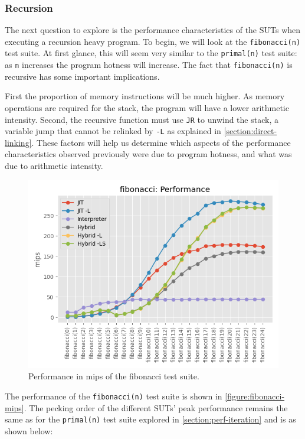 \subsubsection{Recursion}
\label{section:perf-recursion}

The next question to explore is the performance characteristics of the SUTs when executing a recursion heavy program. To begin, we will look at the \texttt{fibonacci(n)} test suite. At first glance, this will seem very similar to the \texttt{primal(n)} test suite: as \texttt{n} increases the program hotness will increase. The fact that \texttt{fibonacci(n)} is recursive has some important implications.

First the proportion of memory instructions will be much higher. As memory operations are required for the stack, the program will have a lower arithmetic intensity. Second, the recursive function must use \texttt{JR} to unwind the stack, a variable jump that cannot be relinked by \texttt{-L} as explained in \autoref{section:direct-linking}. These factors will help us determine which aspects of the performance characteristics observed previously were due to program hotness, and what was due to arithmetic intensity.

\begin{figure}[H]
    \centering
    \includegraphics[scale=0.75]{output/graphs/tests/all/fibonacci/mips.png}
    \caption{Performance in mips of the fibonacci test suite.}
    \label{figure:fibonacci-mips}
\end{figure}

The performance of the \texttt{fibonacci(n)} test suite is shown in \autoref{figure:fibonacci-mips}. The pecking order of the different SUTs' peak performance remains the same as for the \texttt{primal(n)} test suite explored in \autoref{section:perf-iteration} and is as shown below:

